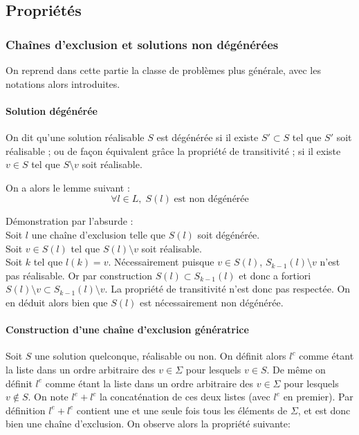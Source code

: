 \documentclass[12pt,a4paper]{article}
\begin{document}
\subsection{Propriétés}
\subsubsection{Chaînes d'exclusion et solutions non dégénérées}

On reprend dans cette partie la classe de problèmes plus générale, avec les notations alors introduites.

 \paragraph{Solution dégénérée}
 
On dit qu'une solution réalisable $S$ est dégénérée si il existe $S'\subset S$ tel que $S'$ soit réalisable ; ou de façon équivalent grâce la propriété de transitivité ; si il existe $v\in S$ tel que $S\setminus v$ soit réalisable.

On a alors le lemme suivant :
\[\forall l\in L,\; S(l)\;\text{est non dégénérée}\]

Démonstration par l'absurde : 
\\Soit $l$ une chaîne d'exclusion telle que $S(l)$ soit dégénérée. 
\\Soit $v\in S(l)$ tel que $S(l)\setminus v$ soit réalisable.
\\Soit $k$ tel que $l(k)=v$.
Nécessairement puisque $v\in S(l)$, $S_{k-1}(l)\setminus v$ n'est pas réalisable. Or par construction $S(l)\subset S_{k-1}(l)$ et donc a fortiori $S(l)\setminus v \subset S_{k-1}(l)\setminus v$. La propriété de transitivité n'est donc pas respectée.
On en déduit alors bien que $S(l)$ est nécessairement non dégénérée.

\paragraph{Construction d'une chaîne d'exclusion génératrice}
Soit $S$ une solution quelconque, réalisable ou non. On définit alors $l^c$ comme étant la liste dans un ordre arbitraire des  $v\in \Sigma$ pour lesquels $v\in S$. De même on définit $l^e$ comme étant la liste dans un ordre arbitraire des $v\in \Sigma$ pour lesquels $v\notin S$. On note $l^e+l^c$ la concaténation de ces deux listes (avec $l^e$ en premier). Par définition $l^e+l^c$ contient une et une seule fois tous les éléments de $\Sigma$, et est donc bien une chaîne d'exclusion. On observe alors la propriété suivante:
\end{document}
